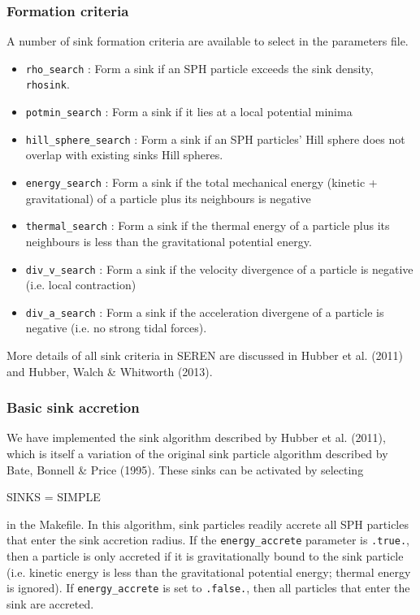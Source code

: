 \documentclass[a4paper]{article}
\newcommand{\var}[1]{\texttt{#1}}
\begin{document}
\subsubsection{Formation criteria}
A number of sink formation criteria are available to select in the parameters file.
\begin{itemize}
\item \var{rho\_search} : Form a sink if an SPH particle exceeds the sink density, \var{rhosink}.
\item \var{potmin\_search} : Form a sink if it lies at a local potential minima
\item \var{hill\_sphere\_search} : Form a sink if an SPH particles' Hill sphere does not overlap with existing sinks Hill spheres.
\item \var{energy\_search} : Form a sink if the total mechanical energy (kinetic + gravitational) of a particle plus its neighbours is negative
\item \var{thermal\_search} : Form a sink if the thermal energy of a particle plus its neighbours is less than the gravitational potential energy.
\item \var{div\_v\_search} : Form a sink if the velocity divergence of a particle is negative (i.e. local contraction)
\item \var{div\_a\_search} : Form a sink if the acceleration divergene of a particle is negative (i.e. no strong tidal forces).
\end{itemize}
More details of all sink criteria in SEREN are discussed in Hubber et al. (2011) and Hubber, Walch \& Whitworth (2013).  


\subsubsection{Basic sink accretion}
We have implemented the sink algorithm described by Hubber et al. (2011), which is itself a variation of the original sink particle algorithm described by Bate, Bonnell \& Price (1995).  These sinks can be activated by selecting \newline

SINKS = SIMPLE \newline

\noindent in the Makefile.  In this algorithm, sink particles readily accrete all SPH particles that enter the sink accretion radius.  If the \var{energy\_accrete} parameter is \var{.true.}, then a particle is only accreted if it is gravitationally bound to the sink particle (i.e. kinetic energy is less than the gravitational potential energy; thermal energy is ignored).  If \var{energy\_accrete} is set to \var{.false.}, then all particles that enter the sink are accreted.
\end{document}

